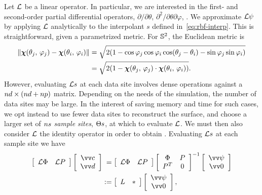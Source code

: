 Let $\mathcal{L}$ be a linear operator. In particular, we are interested in the first- and
second-order partial differential operators, $\partial/\partial\theta$,
$\partial^2/\partial\theta\partial\varphi$, . We approximate $\mathcal{L}\psi$ by
applying $\mathcal{L}$ analytically to the interpolant $s$ defined in~\eqref{eq:rbf-interp}. This
is straightforward, given a parametrized metric. For $\mathbb{S}^2$, the Euclidean metric is
\begin{equation}\label{eq:sphere-metric}
    \begin{aligned}
    \|\boldsymbol{\chi}(\theta_j,\,\varphi_j) - \boldsymbol{\chi}(\theta_i,\,\varphi_i)\|
    &= \sqrt{2(1 - \cos\varphi_j\cos\varphi_i\cos(\theta_j-\theta_i) - \sin\varphi_j\sin\varphi_i)} \\
    &= \sqrt{2(1-\boldsymbol{\chi}(\theta_j,\,\varphi_j)\cdot\boldsymbol{\chi}(\theta_i,\,\varphi_i))}.
\end{aligned}
\end{equation}
However, evaluating $\mathcal{L} s$ at each data site involves dense operations against a
$\data\cardinality\times(\data\cardinality+\poly\cardinality)$ matrix. Depending on the
needs of the simulation, the number of data sites may be large.  In the interest of
saving memory and time for such cases, we opt instead to use fewer data sites to
reconstruct the surface, and choose a larger set of $\sample\cardinality$ \emph{sample
sites}, $\sample\sites$, at which to evaluate $\mathcal{L}$. We must then also consider $\mathcal{L}$ the
identity operator in order to obtain . Evaluating $\mathcal{L} s$ at each
sample site we have
\begin{equation}\label{eq:rbf-operator}
    \begin{aligned}
    \left[\begin{array}{cc}
            \L\Phi & \L P
    \end{array}\right]\left[\begin{array}{c}
            \arr{c} \\ \arr{d}
    \end{array}\right] &\hphantom{:}=
    \left[\begin{array}{cc}
            \L\Phi & \L P
    \end{array}\right]\left[\begin{array}{cc}
            \Phi & P \\ P^T & 0
    \end{array}\right]^{-1}\left[\begin{array}{c}
            \arr{\psi} \\ \arr{0}
    \end{array}\right] \\ &:=
    \left[\begin{array}{cc}
            L & \ast
    \end{array}\right]\left[\begin{array}{c}
            \arr{\psi} \\ \arr{0}
    \end{array}\right],
\end{aligned}
\end{equation}
